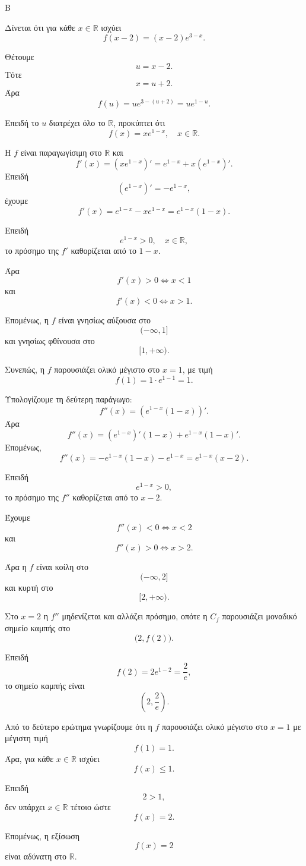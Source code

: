 

\begin{thema}{Β}
\begin{erwthma}
\item Δίνεται ότι για κάθε $x\in\mathbb{R}$ ισχύει
\[
f(x-2)=(x-2)e^{3-x}.
\]

Θέτουμε
\[
u=x-2.
\]
Τότε
\[
x=u+2.
\]
Άρα
\[
f(u)=u e^{3-(u+2)}
=u e^{1-u}.
\]

Επειδή το $u$ διατρέχει όλο το $\mathbb{R}$, προκύπτει ότι
\[
f(x)=x e^{1-x},\quad x\in\mathbb{R}.
\]

\item Η $f$ είναι παραγωγίσιμη στο $\mathbb{R}$ και
\[
f'(x)=\left(xe^{1-x}\right)'
=e^{1-x}+x\left(e^{1-x}\right)'.
\]
Επειδή
\[
\left(e^{1-x}\right)'=-e^{1-x},
\]
έχουμε
\[
f'(x)=e^{1-x}-xe^{1-x}
=e^{1-x}(1-x).
\]

Επειδή
\[
e^{1-x}>0,\quad x\in\mathbb{R},
\]
το πρόσημο της $f'$ καθορίζεται από το $1-x$.

Άρα
\[
f'(x)>0 \Leftrightarrow x<1
\]
και
\[
f'(x)<0 \Leftrightarrow x>1.
\]

Επομένως, η $f$ είναι γνησίως αύξουσα στο
\[
(-\infty,1]
\]
και γνησίως φθίνουσα στο
\[
[1,+\infty).
\]

Συνεπώς, η $f$ παρουσιάζει ολικό μέγιστο στο $x=1$, με τιμή
\[
f(1)=1\cdot e^{1-1}=1.
\]

\item Υπολογίζουμε τη δεύτερη παράγωγο:
\[
f''(x)=\left(e^{1-x}(1-x)\right)'.
\]
Άρα
\[
f''(x)=\left(e^{1-x}\right)'(1-x)+e^{1-x}(1-x)'.
\]
Επομένως,
\[
f''(x)=-e^{1-x}(1-x)-e^{1-x}
=e^{1-x}(x-2).
\]

Επειδή
\[
e^{1-x}>0,
\]
το πρόσημο της $f''$ καθορίζεται από το $x-2$.

Έχουμε
\[
f''(x)<0 \Leftrightarrow x<2
\]
και
\[
f''(x)>0 \Leftrightarrow x>2.
\]

Άρα η $f$ είναι κοίλη στο
\[
(-\infty,2]
\]
και κυρτή στο
\[
[2,+\infty).
\]

Στο $x=2$ η $f''$ μηδενίζεται και αλλάζει πρόσημο, οπότε η $C_f$ παρουσιάζει μοναδικό σημείο καμπής στο
\[
\bigl(2,f(2)\bigr).
\]

Επειδή
\[
f(2)=2e^{1-2}=\frac{2}{e},
\]
το σημείο καμπής είναι
\[
\left(2,\frac{2}{e}\right).
\]

\item Από το δεύτερο ερώτημα γνωρίζουμε ότι η $f$ παρουσιάζει ολικό μέγιστο στο $x=1$ με μέγιστη τιμή
\[
f(1)=1.
\]
Άρα, για κάθε $x\in\mathbb{R}$ ισχύει
\[
f(x)\leq 1.
\]

Επειδή
\[
2>1,
\]
δεν υπάρχει $x\in\mathbb{R}$ τέτοιο ώστε
\[
f(x)=2.
\]

Επομένως, η εξίσωση
\[
f(x)=2
\]
είναι αδύνατη στο $\mathbb{R}$.
\end{erwthma}
\end{thema}

